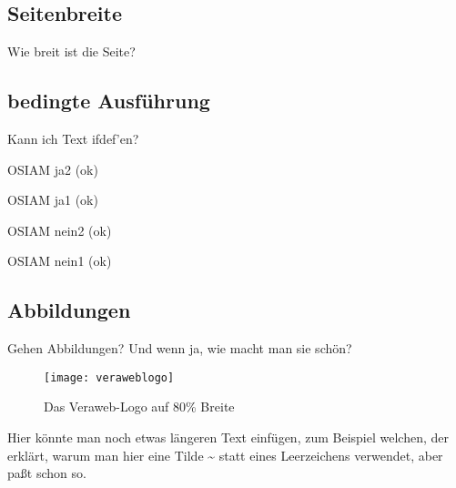\documentclass{tarentanleitung}
\begin{document}
\subsection{Seitenbreite}

Wie breit ist die Seite? %
%

\the\textwidth

\subsection{bedingte Ausführung}

Kann ich Text ifdef'en?

\newif\ifosiam
\osiamtrue

\ifosiam
 OSIAM ja2 (ok)
\else
 OSIAM nein2
\fi

\ifosiam
 OSIAM ja1 (ok)
\fi

\ifosiam\else
 OSIAM nein1
\fi

\osiamfalse

\ifosiam
 OSIAM ja2
\else
 OSIAM nein2 (ok)
\fi

\ifosiam
 OSIAM ja1
\fi

\ifosiam\else
 OSIAM nein1 (ok)
\fi

\subsection{Abbildungen}

Gehen Abbildungen? Und wenn ja, wie macht man sie schön?

\begin{figure}[h!]
 \centering\texttt{[image: veraweblogo]}
 \caption{Das Veraweb-Logo auf 80\% Breite}
 \label{fig:logovw}
\end{figure}

Hier könnte man noch etwas längeren Text einfügen, zum Beispiel
welchen, der erklärt, warum man hier eine Tilde \~{} statt eines
Leerzeichens verwendet, aber paßt schon so.
\end{document}
